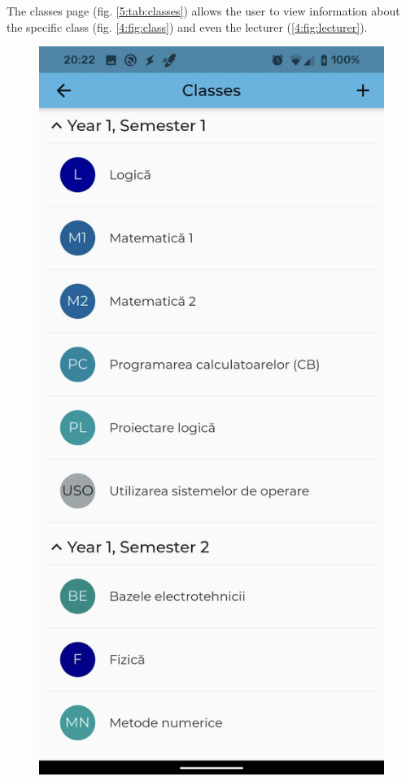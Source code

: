 The classes page (fig. \ref{5:tab:classes}) allows the user to view information about the specific class (fig. \ref{4:fig:class}) and even the lecturer (\ref{4:fig:lecturer}).

\begin{figure}[!ht]
    \centering
    \begin{minipage}[b]{0.26\textwidth}
        \captionsetup{justification=centering}
        \includegraphics[width=\textwidth]{figures/app/flutter/classes.jpg}

\end{minipage}
\end{figure}
